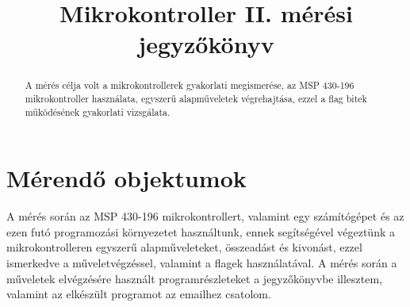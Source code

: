 \documentclass[10pt, conference, a4paper]{ITKproc}
\begin{document}
\title{Mikrokontroller II. mérési jegyzőkönyv}
\author{
}


\maketitle

\begin{abstract}
A mérés célja volt a mikrokontrollerek gyakorlati megismerése, az MSP 430-196 mikrokontroller használata, egyszerű alapműveletek végrehajtása, ezzel a flag bitek működésének gyakorlati vizsgálata. 
\end{abstract}

\IEEEpeerreviewmaketitle
\section{Mérendő objektumok}

A mérés során az MSP 430-196 mikrokontrollert, valamint egy számítógépet és az ezen futó programozási környezetet használtunk, ennek segítségével végeztünk a mikrokontrolleren egyszerű alapműveleteket, összeadást és kivonást, ezzel ismerkedve a műveletvégzéssel, valamint a flagek használatával. A mérés során a műveletek elvégzésére használt programrészleteket a jegyzőkönyvbe illesztem, valamint az elkészült programot az emailhez csatolom. 
\end{document}
